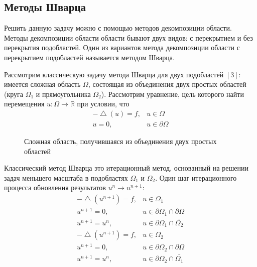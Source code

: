 \documentclass[a4paper]{article}
\begin{document}
\newpage

\subsection{Методы Шварца}

Решить данную задачу можно с помощью методов декомпозиции области. Методы декомпозиции области области бывают двух видов: с перекрытием и без перекрытия подобластей. Один из вариантов метода декомпозиции области с перекрытием подобластей называется методом Шварца.

Рассмотрим классическую задачу метода Шварца для двух подобластей $\left[3\right]$: имеется сложная область $\Omega$, состоящая из объединения двух простых областей (круга $\Omega_1$ и прямоугольника $\Omega_2$). Рассмотрим уравнение, цель которого найти перемещения $u: \Omega \rightarrow \mathbb{R}$ при условии, что
\begin{equation*}
\begin{array}{rl}
-\bigtriangleup \!(u) = f, & u \in \Omega \\
u = 0, & u \in \partial \Omega
\end{array}
\end{equation*}

\begin{figure}[h]
\caption{Сложная область, получившаяся из объединения двух простых областей}
\label{fig:image_01}
\end{figure}

Классический метод Шварца это итерационный метод, основанный на решении задач меньшего масштаба в подобластях $\Omega_1$ и $\Omega_2$. Один шаг итерационного процесса обновления результатов $u^n \rightarrow u^{n+1}$:
\begin{eqnarray*}
-\bigtriangleup \! (u^{n+1}) = f, & u \in \Omega_1 \\
u^{n+1} = 0, & u \in \partial \Omega_1 \cap \partial \Omega \\
u^{n+1} = u^n, & u \in \partial \Omega_1 \cap \bar{\Omega_2}
\end{eqnarray*}
\begin{eqnarray*}
-\bigtriangleup \! (u^{n+1}) = f, & u \in \Omega_2 \\
u^{n+1} = 0, & u \in \partial \Omega_2 \cap \partial \Omega \\
u^{n+1} = u^n, & u \in \partial \Omega_2 \cap \bar{\Omega_1}
\end{eqnarray*}
\end{document}

